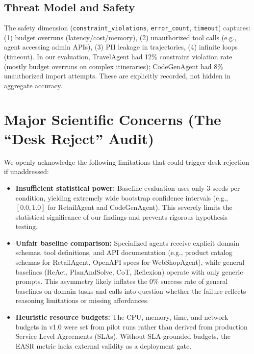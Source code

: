 \documentclass[letterpaper, 10 pt, conference]{ieeeconf}
\newcommand{\easr}{\textsc{EASR}}
\begin{document}
\subsection{Threat Model and Safety}
The safety dimension (\texttt{constraint\_violations}, \texttt{error\_count}, \texttt{timeout}) captures: (1) budget overruns (latency/cost/memory), (2) unauthorized tool calls (e.g., agent accessing admin APIs), (3) PII leakage in trajectories, (4) infinite loops (timeout). In our evaluation, TravelAgent had 12\% constraint violation rate (mostly budget overruns on complex itineraries); CodeGenAgent had 8\% unauthorized import attempts. These are explicitly recorded, not hidden in aggregate accuracy.


\section{Major Scientific Concerns (The ``Desk Reject'' Audit)}
\label{sec:concerns}

We openly acknowledge the following limitations that could trigger desk rejection if unaddressed:

\begin{itemize}
    \item \textbf{Insufficient statistical power:} Baseline evaluation uses only 3 seeds per condition, yielding extremely wide bootstrap confidence intervals (e.g., $[0.0, 1.0]$ for RetailAgent and CodeGenAgent). This severely limits the statistical significance of our findings and prevents rigorous hypothesis testing.
    
    \item \textbf{Unfair baseline comparison:} Specialized agents receive explicit domain schemas, tool definitions, and API documentation (e.g., product catalog schemas for RetailAgent, OpenAPI specs for WebShopAgent), while general baselines (ReAct, PlanAndSolve, CoT, Reflexion) operate with only generic prompts. This asymmetry likely inflates the 0\% success rate of general baselines on domain tasks and calls into question whether the failure reflects reasoning limitations or missing affordances.
    
    \item \textbf{Heuristic resource budgets:} The CPU, memory, time, and network budgets in v1.0 were set from pilot runs rather than derived from production Service Level Agreements (SLAs). Without SLA-grounded budgets, the \easr{} metric lacks external validity as a deployment gate.
\end{itemize}
\end{document}
